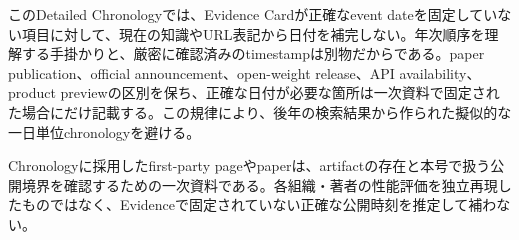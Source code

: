 このDetailed Chronologyでは、Evidence Cardが正確なevent dateを固定していない項目に対して、現在の知識やURL表記から日付を補完しない。年次順序を理解する手掛かりと、厳密に確認済みのtimestampは別物だからである。paper publication、official announcement、open-weight release、API availability、product previewの区別を保ち、正確な日付が必要な箇所は一次資料で固定された場合にだけ記載する。この規律により、後年の検索結果から作られた擬似的な一日単位chronologyを避ける。\autocite{src-20fd9bba2e7a,src-b307b4b82867,src-bf581c89a17f}


\begin{claimboundary}
Chronologyに採用したfirst-party pageやpaperは、artifactの存在と本号で扱う公開境界を確認するための一次資料である。各組織・著者の性能評価を独立再現したものではなく、Evidenceで固定されていない正確な公開時刻を推定して補わない。\autocite{src-20fd9bba2e7a,src-50244427230b,src-a4561c635fe6,src-b307b4b82867,src-bf581c89a17f}
\end{claimboundary}
